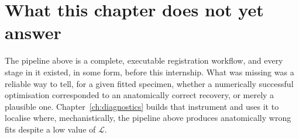 \section{What this chapter does not yet answer}

The pipeline above is a complete, executable registration workflow, and every stage in it
existed, in some form, before this internship. What was missing was a reliable way to tell, for a given fitted specimen,
whether a numerically successful optimisation corresponded to an
anatomically correct recovery, or merely a plausible one. Chapter~\ref{ch:diagnostics}
builds that instrument and uses it to localise where, mechanistically, the
pipeline above produces anatomically wrong fits despite a low value of
$\mathcal{L}$.
